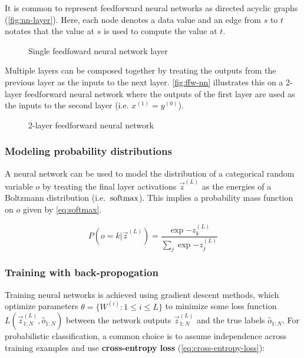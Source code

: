 It is common to represent feedforward neural networks as directed acyclic
graphs (\autoref{fig:nn-layer}). Here, each node denotes a data value and
an edge from $s$ to $t$ notates that the value at $s$ is used to compute the
value at $t$.

\begin{figure}[htpb]
    \centering
    
    \caption{Single feedfoward neural network layer}
    \label{fig:nn-layer}
\end{figure}

Multiple layers can be composed together by treating the outputs from the previous layer
as the inputs to the next layer. \autoref{fig:ffw-nn} illustrates this on a 2-layer
feedforward neural network where the outputs of the first layer are used as the
inputs to the second layer (i.e. $x^{(1)} = y^{(0)}$).

\begin{figure}[htbp]
    \centering
    
    \caption{2-layer feedforward neural network}
    \label{fig:ffw-nn}
\end{figure}


\subsubsection{Modeling probability distributions}

A neural network can be used to model the distribution of a categorical random
variable $o$ by treating the final layer activations $\vec{z}^{(L)}$ as the
energies of a Boltzmann distribution (i.e.\ $\operatorname*{softmax}$). This implies a
probability mass function on $o$ given by \autoref{eq:softmax}.

\begin{equation}
    \label{eq:softmax}
    P(o = k | \vec{z}^{(L)}) = \frac{\exp{-z^{(L)}_k}}{ \sum_{j} \exp{-z^{(L)}_j} }
\end{equation}

\subsubsection{Training with back-propogation}

Training neural networks is achieved using gradient descent methods, which
optimize parameters $\theta = \{W^{(i)} : 1 \leq i \leq L \}$ to minimize some
loss function $L(\vec{z}^{(L)}_{1:N}, \hat{o}_{1:N})$ between the network
outputs $\vec{z}^{(L)}_{1:N}$ and the true labels $\hat{o}_{1:N}$. For
probabilistic classification, a common choice is to assume independence
across training examples and use \textbf{cross-entropy loss}
(\autoref{eq:cross-entropy-loss}):

